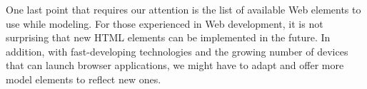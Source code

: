 \begin{itemize}
        One last point that requires our attention is the list of available Web elements to use while modeling. For those experienced in Web development, it is not surprising that new HTML elements can be implemented in the future. In addition, with fast-developing technologies and the growing number of devices that can launch browser applications, we might have to adapt and offer more model elements to reflect new ones.
\end{itemize}
